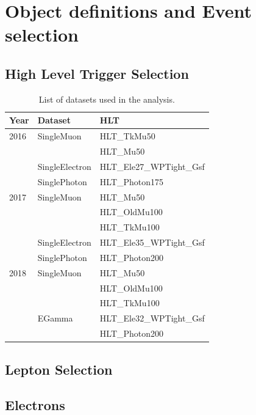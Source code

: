 \section{Object definitions and Event selection}

\subsection{High Level Trigger Selection}


\begin{table}[h]
\centering
\caption{List of datasets used in the analysis.}
\begin{tabular}{|l|l|l|}
\hline
Year & Dataset & HLT                \\ \hline
2016 & SingleMuon     & HLT\_TkMu50 \\
     &                & HLT\_Mu50   \\
     & SingleElectron & HLT\_Ele27\_WPTight\_Gsf  \\
     & SinglePhoton   & HLT\_Photon175            \\ \hline
2017 & SingleMuon     & HLT\_Mu50       \\
     &                & HLT\_OldMu100   \\
     &                & HLT\_TkMu100    \\
     & SingleElectron & HLT\_Ele35\_WPTight\_Gsf  \\
     & SinglePhoton   & HLT\_Photon200            \\ \hline
2018 & SingleMuon & HLT\_Mu50     \\
     &            & HLT\_OldMu100 \\
     &            & HLT\_TkMu100  \\ \hline
     & EGamma     & HLT\_Ele32\_WPTight\_Gsf \\
     &            & HLT\_Photon200           \\ \hline
\end{tabular}
\label{tab:Datasets}
\end{table}


\subsection{Lepton Selection}

\subsection{Electrons}

